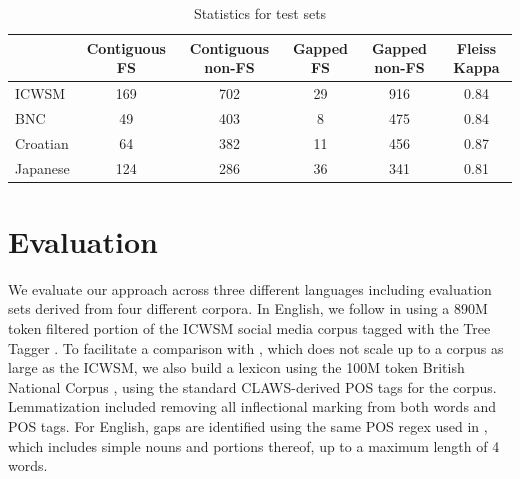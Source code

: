\documentclass[11pt,letterpaper]{article}
\begin{document}
\begin{table}[!bt]
 
 \begin{center}
  \caption{ Statistics for test sets}
	 \label{tab:stats}
	 \begin{tabular}{lccccc}

       \hline
			& Contiguous FS & Contiguous non-FS & Gapped FS & Gapped non-FS & Fleiss Kappa\\
			 \hline
			ICWSM & 169 & 702 & 29 & 916& 0.84 \\
			BNC & 49 & 403 & 8 & 475 & 0.84 \\
			Croatian & 64 & 382 & 11 & 456 & 0.87 \\
			Japanese & 124 & 286 & 36 & 341 & 0.81\\
       \hline
 \end{tabular}

 \end{center}

 \end{table}

\section{Evaluation}

We evaluate our approach across three different languages including evaluation sets derived from four different corpora. In English, we follow  in using a 890M token filtered portion of the ICWSM social media corpus \cite{ICWSM} tagged with the Tree Tagger \cite{Schmid95}. To facilitate a comparison with , which does not scale up to a corpus as large as the ICWSM, we also build a lexicon using the 100M token British National Corpus \cite{BNC}, using the standard CLAWS-derived POS tags for the corpus. Lemmatization included removing all inflectional marking from both words and POS tags. For English, gaps are identified using the same POS regex used in , which includes simple nouns and portions thereof, up to a maximum length of 4 words.
\end{document}
